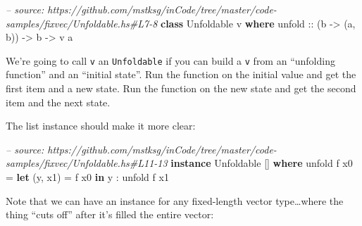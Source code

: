 \documentclass[]{article}
\newenvironment{Shaded}{\begin{snugshade}}{\end{snugshade}}
\newcommand{\CommentTok}[1]{\textcolor[rgb]{0.56,0.35,0.01}{\textit{#1}}}
\newcommand{\DataTypeTok}[1]{\textcolor[rgb]{0.13,0.29,0.53}{#1}}
\newcommand{\DecValTok}[1]{\textcolor[rgb]{0.00,0.00,0.81}{#1}}
\newcommand{\FunctionTok}[1]{\textcolor[rgb]{0.00,0.00,0.00}{#1}}
\newcommand{\KeywordTok}[1]{\textcolor[rgb]{0.13,0.29,0.53}{\textbf{#1}}}
\newcommand{\NormalTok}[1]{#1}
\newcommand{\OtherTok}[1]{\textcolor[rgb]{0.56,0.35,0.01}{#1}}
\begin{document}
\begin{Shaded}
\begin{Highlighting}[]
\CommentTok{-- source: https://github.com/mstksg/inCode/tree/master/code-samples/fixvec/Unfoldable.hs#L7-8}
\KeywordTok{class} \DataTypeTok{Unfoldable}\NormalTok{ v }\KeywordTok{where}
\OtherTok{    unfold ::}\NormalTok{ (b }\OtherTok{->}\NormalTok{ (a, b)) }\OtherTok{->}\NormalTok{ b }\OtherTok{->}\NormalTok{ v a}
\end{Highlighting}
\end{Shaded}

We're going to call \texttt{v} an \texttt{Unfoldable} if you can build a
\texttt{v} from an ``unfolding function'' and an ``initial state''. Run the
function on the initial value and get the first item and a new state. Run the
function on the new state and get the second item and the next state.

The list instance should make it more clear:

\begin{Shaded}
\begin{Highlighting}[]
\CommentTok{-- source: https://github.com/mstksg/inCode/tree/master/code-samples/fixvec/Unfoldable.hs#L11-13}
\KeywordTok{instance} \DataTypeTok{Unfoldable}\NormalTok{ [] }\KeywordTok{where}
\NormalTok{    unfold f x0 }\FunctionTok{=} \KeywordTok{let}\NormalTok{ (y, x1) }\FunctionTok{=}\NormalTok{ f x0}
                  \KeywordTok{in}\NormalTok{  y }\FunctionTok{:}\NormalTok{ unfold f x1}
\end{Highlighting}
\end{Shaded}

\begin{Shaded}
\end{Shaded}

Note that we can have an instance for any fixed-length vector type\ldots{}where
the thing ``cuts off'' after it's filled the entire vector:
\end{document}
